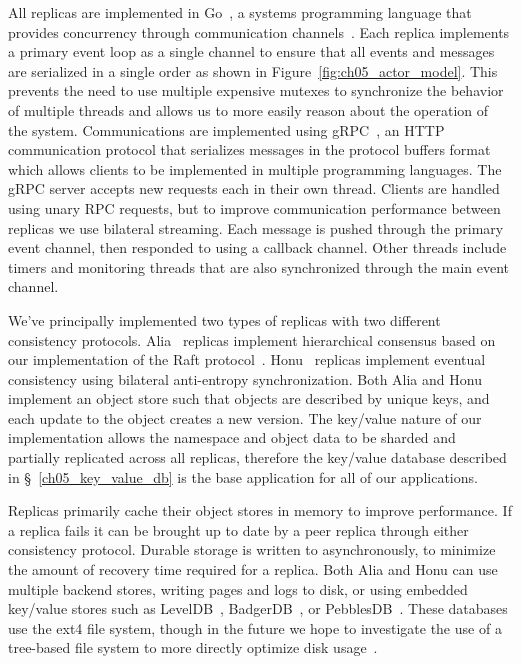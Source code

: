 All replicas are implemented in Go~\cite{golang}, a systems programming language that provides concurrency through communication channels~\cite{csp}.
Each replica implements a primary event loop as a single channel to ensure that all events and messages are serialized in a single order as shown in Figure~\ref{fig:ch05_actor_model}.
This prevents the need to use multiple expensive mutexes to synchronize the behavior of multiple threads and allows us to more easily reason about the operation of the system.
Communications are implemented using gRPC~\cite{grpc}, an HTTP communication protocol that serializes messages in the protocol buffers format~\cite{protocol_buffers} which allows clients to be implemented in multiple programming languages.
The gRPC server accepts new requests each in their own thread.
Clients are handled using unary RPC requests, but to improve communication performance between replicas we use bilateral streaming.
Each message is pushed through the primary event channel, then responded to using a callback channel.
Other threads include timers and monitoring threads that are also synchronized through the main event channel.

We've principally implemented two types of replicas with two different consistency protocols.
Alia~\cite{alia} replicas implement hierarchical consensus based on our implementation of the Raft protocol~\cite{alia_raft}.
Honu~\cite{honu} replicas implement eventual consistency using bilateral anti-entropy synchronization.
Both Alia and Honu implement an object store such that objects are described by unique keys, and each update to the object creates a new version.
The key/value nature of our implementation allows the namespace and object data to be sharded and partially replicated across all replicas, therefore the key/value database described in \S~\ref{ch05_key_value_db} is the base application for all of our applications.

Replicas primarily cache their object stores in memory to improve performance.
If a replica fails it can be brought up to date by a peer replica through either consistency protocol.
Durable storage is written to asynchronously, to minimize the amount of recovery time required for a replica.
Both Alia and Honu can use multiple backend stores, writing pages and logs to disk, or using embedded key/value stores such as LevelDB~\cite{leveldb}, BadgerDB~\cite{badgerdb}, or PebblesDB~\cite{pebblesdb}.
These databases use the ext4 file system, though in the future we hope to investigate the use of a tree-based file system to more directly optimize disk usage~\cite{btrfs}.

